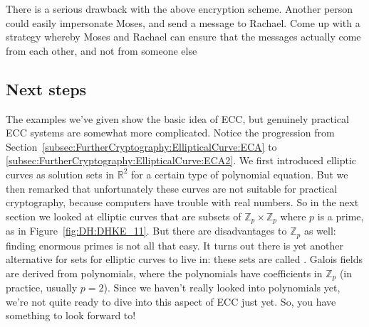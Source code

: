 \begin{exercise}{}
There is a serious drawback with the above encryption scheme. Another person could easily impersonate Moses, and send a message to Rachael. Come up with a strategy whereby Moses and Rachael can ensure that the messages actually come from each other, and not from someone else 
\end{exercise}

\subsection{Next steps}
\label{subsec:FurtherCryptography:EllipticalCurve:NextSteps} 

The examples we've given show the basic idea of ECC, but genuinely practical ECC systems are somewhat more complicated. Notice the progression from Section~\ref{subsec:FurtherCryptography:EllipticalCurve:ECA} to \ref{subsec:FurtherCryptography:EllipticalCurve:ECA2}. We first introduced elliptic curves as solution sets in $\mathbb{R}^2$ for a certain type of polynomial equation. But we then remarked that unfortunately these curves are not suitable for practical cryptography, because computers have trouble with real numbers. So in the next section we looked at elliptic curves that are subsets of $\mathbb{Z}_p \times \mathbb{Z}_p$ where $p$ is a prime, as in Figure~\ref{fig:DH:DHKE_11}. But there are disadvantages to $\mathbb{Z}_p$ as well: finding enormous primes is not all that easy. It turns out there is yet another alternative for sets for elliptic curves to live in:  these sets are called . Galois fields are derived from polynomials, where the polynomials have coefficients in $\mathbb{Z}_p$ (in practice, usually $p=2$).  Since we haven't really looked into polynomials yet, we're not quite ready to dive into this aspect of ECC just yet.  So, you have something to look forward to! 

